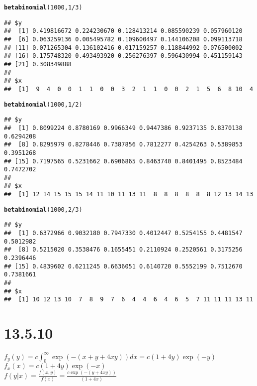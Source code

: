 \documentclass{article}\usepackage[]{graphicx}\usepackage[]{color}
\makeatletter
\newcommand{\hlnum}[1]{\textcolor[rgb]{0.686,0.059,0.569}{#1}}%
\newcommand{\hlopt}[1]{\textcolor[rgb]{0,0,0}{#1}}%
\newcommand{\hlstd}[1]{\textcolor[rgb]{0.345,0.345,0.345}{#1}}%
\newcommand{\hlkwd}[1]{\textcolor[rgb]{0.737,0.353,0.396}{\textbf{#1}}}%
\newenvironment{kframe}{%
 \def\at@end@of@kframe{}%
 \ifinner\ifhmode%
  \def\at@end@of@kframe{\end{minipage}}%
  \begin{minipage}{\columnwidth}%
 \fi\fi%
 \def\FrameCommand##1{\hskip\@totalleftmargin \hskip-\fboxsep
 \colorbox{shadecolor}{##1}\hskip-\fboxsep
     \hskip-\linewidth \hskip-\@totalleftmargin \hskip\columnwidth}%
 \MakeFramed {\advance\hsize-\width
   \@totalleftmargin\z@ \linewidth\hsize
   \@setminipage}}%
 {\par\unskip\endMakeFramed%
 \at@end@of@kframe}
\newenvironment{knitrout}{}{} %
\makeatother
\begin{document}
\begin{knitrout}
\begin{kframe}
\begin{alltt}
\hlkwd{betabinomial}\hlstd{(}\hlnum{1000}\hlstd{,}\hlnum{1}\hlopt{/}\hlnum{3}\hlstd{)}
\end{alltt}
\begin{verbatim}
## $y
##  [1] 0.419816672 0.224230670 0.128413214 0.085590239 0.057960120
##  [6] 0.063259136 0.005495782 0.109600497 0.144106208 0.099113718
## [11] 0.071265304 0.136102416 0.017159257 0.118844992 0.076500002
## [16] 0.175748320 0.493493920 0.256276397 0.596430994 0.451159143
## [21] 0.308349888
## 
## $x
##  [1]  9  4  0  0  1  1  0  0  3  2  1  1  0  0  2  1  5  6  8 10  4
\end{verbatim}
\begin{alltt}
\hlkwd{betabinomial}\hlstd{(}\hlnum{1000}\hlstd{,}\hlnum{1}\hlopt{/}\hlnum{2}\hlstd{)}
\end{alltt}
\begin{verbatim}
## $y
##  [1] 0.8099224 0.8780169 0.9966349 0.9447386 0.9237135 0.8370138 0.6294208
##  [8] 0.8295979 0.8278446 0.7387856 0.7812277 0.4254263 0.5389853 0.3951268
## [15] 0.7197565 0.5231662 0.6906865 0.8463740 0.8401495 0.8523484 0.7472702
## 
## $x
##  [1] 12 14 15 15 15 14 11 10 11 13 11  8  8  8  8  8  8 12 13 14 13
\end{verbatim}
\begin{alltt}
\hlkwd{betabinomial}\hlstd{(}\hlnum{1000}\hlstd{,}\hlnum{2}\hlopt{/}\hlnum{3}\hlstd{)}
\end{alltt}
\begin{verbatim}
## $y
##  [1] 0.6372966 0.9032180 0.7947330 0.4012447 0.5254155 0.4481547 0.5012982
##  [8] 0.5215020 0.3538476 0.1655451 0.2110924 0.2520561 0.3175256 0.2396446
## [15] 0.4839602 0.6211245 0.6636051 0.6140720 0.5552199 0.7512670 0.7381661
## 
## $x
##  [1] 10 12 13 10  7  8  9  7  6  4  4  6  4  6  5  7 11 11 11 13 11
\end{verbatim}
\end{kframe}
\end{knitrout}


\section{13.5.10}




$f_{y}(y)=c\int_{0}^{\infty} 
\exp(-(x+y+4xy))dx= c(1+4y)\exp(-y)$\\

$f_{x}(x)=c(1+4y)\exp(-x)$\\

$f(y|x)=\frac{f(x,y)}{f(x)}=\frac{c\exp(-(y+4xy))}{(1+4x)}$\\
\end{document}
